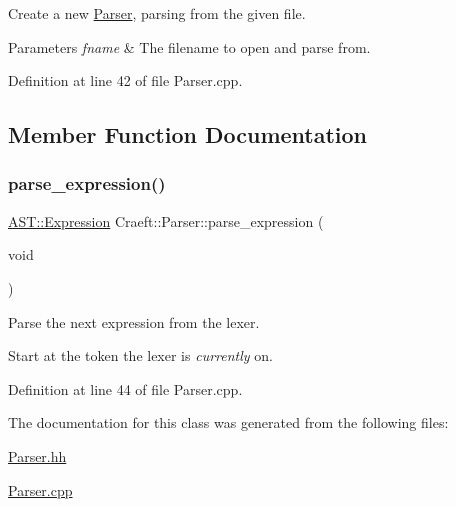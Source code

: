 Create a new \hyperlink{class_craeft_1_1_parser}{Parser}, parsing from the given file. 


\begin{DoxyParams}{Parameters}
{\em fname} & The filename to open and parse from. \\
\hline
\end{DoxyParams}


Definition at line 42 of file Parser.\+cpp.



\subsection{Member Function Documentation}
\hypertarget{class_craeft_1_1_parser_ae991d774fc82c09ec4a4223b883580a9}{}\label{class_craeft_1_1_parser_ae991d774fc82c09ec4a4223b883580a9} 
\subsubsection{\texorpdfstring{parse\+\_\+expression()}{parse\_expression()}}
{\footnotesize\ttfamily \hyperlink{_expression_8hh_aef28cabf6d8e7cb8324232e27e69606d}{A\+S\+T\+::\+Expression} Craeft\+::\+Parser\+::parse\+\_\+expression (\begin{DoxyParamCaption}\item[{void}]{ }\end{DoxyParamCaption})}



Parse the next expression from the lexer. 

Start at the token the lexer is {\itshape currently} on. 

Definition at line 44 of file Parser.\+cpp.



The documentation for this class was generated from the following files\+:\begin{DoxyCompactItemize}
\item 
\hyperlink{_parser_8hh}{Parser.\+hh}\item 
\hyperlink{_parser_8cpp}{Parser.\+cpp}\end{DoxyCompactItemize}
